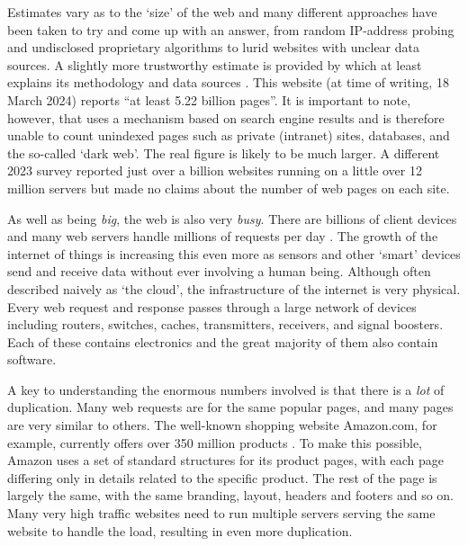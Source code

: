 Estimates vary as to the `size' of the web and many different approaches have been taken to try and come up with an answer, from random IP-address probing \citep{Xing2003} and undisclosed proprietary algorithms \citep{Murray2000} to lurid websites with unclear data sources\citep{LiveCounter2018}. A slightly more trustworthy estimate is provided by \citet{Worldwidewebsize2018} which at least explains its methodology and data sources \citep{Kunder2008}. This website (at time of writing, 18 March 2024) reports \enquote{at least 5.22 billion pages}. It is important to note, however, that \citet{Worldwidewebsize2018} uses a mechanism based on search engine results and is therefore unable to count unindexed pages such as private (\gls{intranet}) sites, databases, and the so-called `\gls{dark web}'. The real figure is likely to be much larger. A different 2023 survey reported just over a billion websites running on a little over 12 million servers \citep{Netcraft2023} but made no claims about the number of web pages on each site.

As well as being \emph{big}, the web is also very \emph{busy}. There are billions of client devices and many web servers handle millions of requests per day . The growth of the \gls{internet of things} is increasing this even more as sensors and other `smart' devices send and receive data without ever involving a human being. Although often described naively as `\gls{the cloud}', the infrastructure of the internet is very physical. Every web request and response passes through a large network of devices including routers, switches, caches, transmitters, receivers, and signal boosters. Each of these contains electronics and the great majority of them also contain software.

A key to understanding the enormous numbers involved is that there is a \emph{lot} of duplication. Many web requests are for the same popular pages, and many pages are very similar to others. The well-known shopping website Amazon.com, for example, currently offers over 350 million products \citep{SellerApp2023}. To make this possible, Amazon uses a set of standard structures for its product pages, with each page differing only in details related to the specific product. The rest of the page is largely the same, with the same branding, layout, headers and footers and so on. Many very high traffic websites need to run multiple servers serving the same website to handle the load, resulting in even more duplication.

